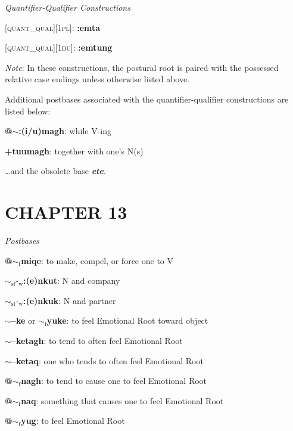 \documentclass{article}
\begin{document}
\bigskip

\textit{Quantifier-Qualifier Constructions}

\textsc{[quant\_qual][1pl]}: \textbf{:emta}

\textsc{[quant\_qual][1du]}: \textbf{:emtung}

\bigskip

\textit{Note}: In these constructions, the postural root is paired with the possessed relative case endings unless otherwise listed above.

\bigskip

Additional postbases associated with the quantifier-qualifier constructions are listed below:
\begin{description}
\item \textbf{@$\sim$:(i/u)magh}: while V-ing
\item \textbf{+tuumagh}: together with one's N(s)
\end{description}

\bigskip

\ldots and the obsolete base \textit{\textbf{ete}}.

\section{CHAPTER 13}

\textit{Postbases}
\begin{description}
\item \textbf{@$\sim_\text{f}$miqe}: to make, compel, or force one to V
\item \textbf{$\sim_\text{sf}\text{-}_\text{w}$:(e)nkut}: N and company
\item \textbf{$\sim_\text{sf}\text{-}_\text{w}$:(e)nkuk}: N and partner
\item \textbf{$\sim$--ke} or \textbf{$\sim_\text{f}$yuke}: to feel Emotional Root toward object
\item \textbf{$\sim$--ketagh}: to tend to often feel Emotional Root
\item \textbf{$\sim$--ketaq}: one who tends to often feel Emotional Root
\item \textbf{@$\sim_\text{f}$nagh}: to tend to cause one to feel Emotional Root
\item \textbf{@$\sim_\text{f}$naq}: something that causes one to feel Emotional Root
\item \textbf{@$\sim_\text{f}$yug}: to feel Emotional Root
\end{description}
\end{document}
